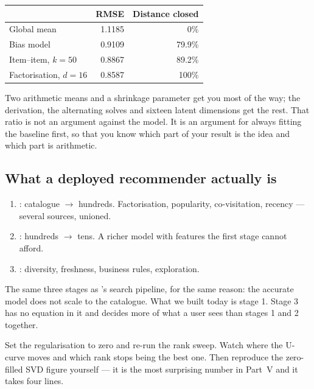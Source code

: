 \documentclass[11pt,a4paper]{article}
\begin{document}
\begin{center}
\small
\begin{tabular}{lrr}
\toprule
 & \textbf{RMSE} & \textbf{Distance closed} \\
\midrule
Global mean             & 1.1185 & 0\% \\
Bias model              & 0.9109 & 79.9\% \\
Item--item, $k = 50$    & 0.8867 & 89.2\% \\
Factorisation, $d = 16$ & 0.8587 & 100\% \\
\bottomrule
\end{tabular}
\end{center}

Two arithmetic means and a shrinkage parameter get you most of the way; the
derivation, the alternating solves and sixteen latent dimensions get the rest.
That ratio is not an argument against the model. It is an argument for always
fitting the baseline first, so that you know which part of your result is the
idea and which part is arithmetic.

\subsection{What a deployed recommender actually is}

\begin{enumerate}[leftmargin=*,nosep]
  \item {}: catalogue $\rightarrow$ hundreds. Factorisation,
        popularity, co-visitation, recency --- several sources, unioned.
  \item {}: hundreds $\rightarrow$ tens. A richer model with features
        the first stage cannot afford.
  \item {}: diversity, freshness, business rules, exploration.
\end{enumerate}

The same three stages as 's search pipeline, for the same reason:
the accurate model does not scale to the catalogue. What we built today is
stage 1. Stage 3 has no equation in it and decides more of what a user sees
than stages 1 and 2 together.

\begin{trybox}[title={Exercise 21.1}]
Set the regularisation to zero and re-run the rank sweep. Watch where the
U-curve moves and which rank stops being the best one. Then reproduce the
zero-filled SVD figure yourself --- it is the most surprising number in Part~V
and it takes four lines.
\end{trybox}
\end{document}
